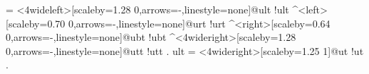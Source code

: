 \documentclass[12pt]{standalone}
\begin{document}
     \jtree[everylabel=\sl,xunit=70pt,arrows=->]
     \! = {}
        <4wideleft>[scaleby=1.28 0,arrows=-,linestyle=none]{}@ult !ult
        ^<left>[scaleby=0.70 0,arrows=-,linestyle=none]{}@urt !urt
        ^<right>[scaleby=0.64 0,arrows=-,linestyle=none]{}@ubt !ubt
        ^<4wideright>[scaleby=1.28 0,arrows=-,linestyle=none]{}@utt !utt
           .
     \!ult = <4wideright>[scaleby=1.25 1]{}@ut !ut
       .
      \endjtree
\end{document}
